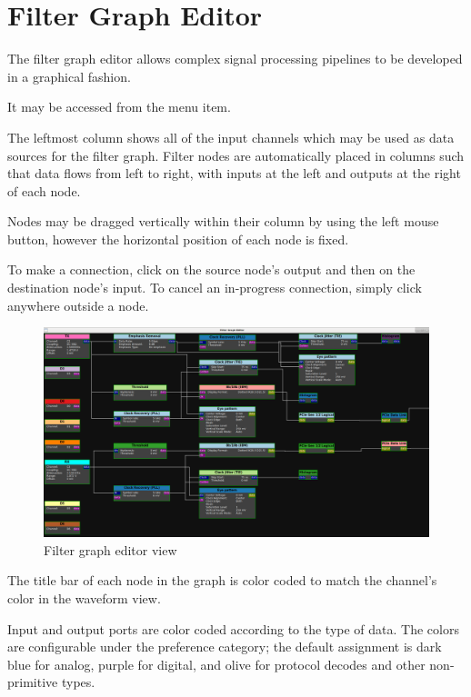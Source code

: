 \chapter{Filter Graph Editor}

The filter graph editor allows complex signal processing pipelines to be developed in a graphical fashion.

It may be accessed from the  menu item.

The leftmost column shows all of the input channels which may be used as data sources for the filter graph. Filter
nodes are automatically placed in columns such that data flows from left to right, with inputs at the left and outputs
at the right of each node.

Nodes may be dragged vertically within their column by using the left mouse button, however the horizontal position of
each node is fixed.

To make a connection, click on the source node's output and then on the destination node's input. To cancel an
in-progress connection, simply click anywhere outside a node.

\begin{figure}[H]
\centering
\includegraphics[width=17cm]{images/graph-editor.png}
\caption{Filter graph editor view}
\label{graph-editor}
\end{figure}

The title bar of each node in the graph is color coded to match the channel's color in the waveform view.

Input and output ports are color coded according to the type of data. The colors are configurable under the
 preference category; the default assignment is dark blue for analog, purple for
digital, and olive for protocol decodes and other non-primitive types.
